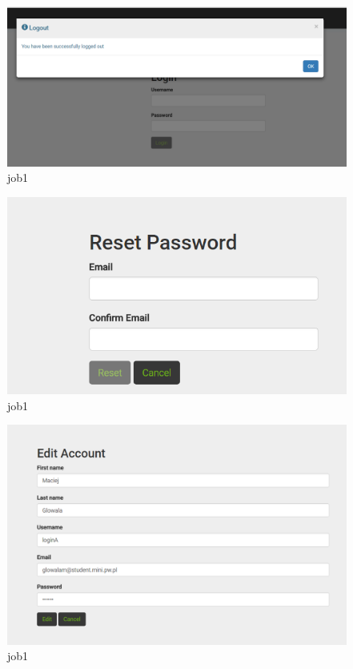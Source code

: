 \documentclass[a4paper,11pt,twoside]{report}
\theoremstyle{definition}
\begin{document}
\begin{figure}[h!]
\begin{center}
\includegraphics[width=\textwidth]{AS/login/3}
\end{center}
\caption{job1}
\end{figure}

\begin{figure}[h!]
\begin{center}
\includegraphics[width=\textwidth]{AS/login/4}
\end{center}
\caption{job1}
\end{figure}

\begin{figure}[h!]
\begin{center}
\includegraphics[width=\textwidth]{AS/login/5}
\end{center}
\caption{job1}
\end{figure}
\end{document}
